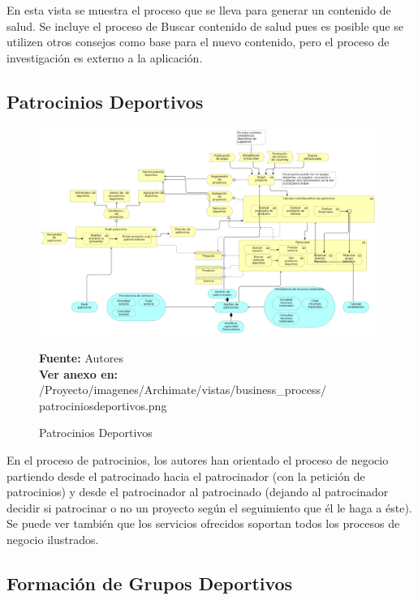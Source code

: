 En esta vista se muestra el proceso que se lleva para generar un contenido de salud. Se incluye el proceso de Buscar contenido de salud pues es posible que se utilizen otros consejos como base para el nuevo contenido, pero el proceso de investigación es externo a la aplicación.

\subsection{Patrocinios Deportivos}

\begin{figure}[!htb]
  \begin{center}
    \includegraphics[width=11cm]{./imagenes/Archimate/vistas/business_process/patrociniosdeportivos.png}
    \caption{Patrocinios Deportivos}
    \label{fig:bp_patrocinios_deportivos}
    \textbf{Fuente:}  Autores \\
     \textbf{Ver anexo en:} /Proyecto/imagenes/Archimate/vistas/business\_process/
     patrociniosdeportivos.png
  \end{center}
\end{figure}

En el proceso de patrocinios, los autores han orientado el proceso de negocio partiendo desde el patrocinado hacia el patrocinador (con la petición de patrocinios) y desde el patrocinador al patrocinado (dejando al patrocinador decidir si patrocinar o no un proyecto según el seguimiento que él le haga a éste). Se puede ver también que los servicios ofrecidos soportan todos los procesos de negocio ilustrados.

\subsection{Formación de Grupos Deportivos}

